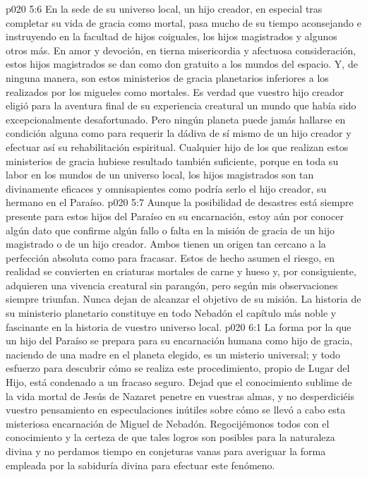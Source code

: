 \vs p020 5:6 En la sede de su universo local, un hijo creador, en especial tras completar su vida de gracia como mortal, pasa mucho de su tiempo aconsejando e instruyendo en la facultad de hijos coiguales, los hijos magistrados y algunos otros más. En amor y devoción, en tierna misericordia y afectuosa consideración, estos hijos magistrados se dan como don gratuito a los mundos del espacio. Y, de ninguna manera, son estos ministerios de gracia planetarios inferiores a los realizados por los migueles como mortales. Es verdad que vuestro hijo creador eligió para la aventura final de su experiencia creatural un mundo que había sido excepcionalmente desafortunado. Pero ningún planeta puede jamás hallarse en condición alguna como para requerir la dádiva de sí mismo de un hijo creador y efectuar así su rehabilitación espiritual. Cualquier hijo de los que realizan estos ministerios de gracia hubiese resultado también suficiente, porque en toda su labor en los mundos de un universo local, los hijos magistrados son tan divinamente eficaces y omnisapientes como podría serlo el hijo creador, su hermano en el Paraíso.
\vs p020 5:7 \pc Aunque la posibilidad de desastres está siempre presente para estos hijos del Paraíso en su encarnación, estoy aún por conocer algún dato que confirme algún fallo o falta en la misión de gracia de un hijo magistrado o de un hijo creador. Ambos tienen un origen tan cercano a la perfección absoluta como para fracasar. Estos de hecho asumen el riesgo, en realidad se convierten en criaturas mortales de carne y hueso y, por consiguiente, adquieren una vivencia creatural sin parangón, pero según mis observaciones siempre triunfan. Nunca dejan de alcanzar el objetivo de su misión. La historia de su ministerio planetario constituye en todo Nebadón el capítulo más noble y fascinante en la historia de vuestro universo local.
\vs p020 6:1 La forma por la que un hijo del Paraíso se prepara para su encarnación humana como hijo de gracia, naciendo de una madre en el planeta elegido, es un misterio universal; y todo esfuerzo para descubrir cómo se realiza este procedimiento, propio de Lugar del Hijo, está condenado a un fracaso seguro. Dejad que el conocimiento sublime de la vida mortal de Jesús de Nazaret penetre en vuestras almas, y no desperdiciéis vuestro pensamiento en especulaciones inútiles sobre cómo se llevó a cabo esta misteriosa encarnación de Miguel de Nebadón. Regocijémonos todos con el conocimiento y la certeza de que tales logros son posibles para la naturaleza divina y no perdamos tiempo en conjeturas vanas para averiguar la forma empleada por la sabiduría divina para efectuar este fenómeno.
